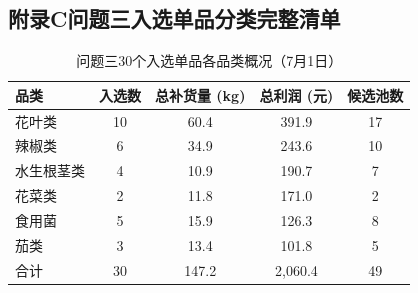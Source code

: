 \documentclass[12pt,a4paper]{article}
\begin{document}
\subsection*{附录C\quad 问题三入选单品分类完整清单}

\begin{table}[H]
\centering
\caption{问题三30个入选单品各品类概况（7月1日）}
\begin{tabular}{lcccc}
\toprule
品类 & 入选数 & 总补货量 (kg) & 总利润 (元) & 候选池数 \\
\midrule
花叶类 & 10 & 60.4 & 391.9 & 17 \\
辣椒类 & 6 & 34.9 & 243.6 & 10 \\
水生根茎类 & 4 & 10.9 & 190.7 & 7 \\
花菜类 & 2 & 11.8 & 171.0 & 2 \\
食用菌 & 5 & 15.9 & 126.3 & 8 \\
茄类 & 3 & 13.4 & 101.8 & 5 \\
\midrule
合计 & 30 & 147.2 & 2,060.4 & 49 \\
\bottomrule
\end{tabular}
\end{table}
\end{document}
